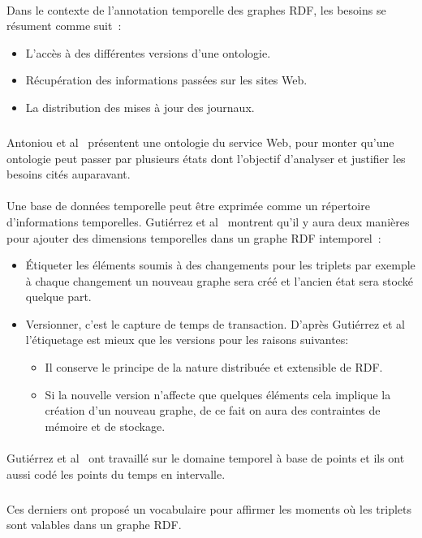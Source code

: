 \documentclass[12pt,a4]{report}
\begin{document}
\paragraph{}
Dans le contexte de l'annotation temporelle des graphes RDF, les besoins se résument comme suit~:
\begin{itemize}
\item L'accès à des différentes versions d’une ontologie.
\item Récupération des informations passées sur les sites Web.
\item La distribution des mises à jour des journaux.
\end{itemize}
\subparagraph{}
Antoniou et al~\cite{antoniou2004} présentent une ontologie du service Web, pour monter qu'une ontologie peut passer par plusieurs états dont l'objectif d'analyser et justifier les besoins cités auparavant.
\paragraph{}
Une base de données temporelle peut être exprimée comme un répertoire d'informations temporelles.
Gutiérrez et al~\cite{gutierrez2007} montrent qu'il y aura deux manières pour ajouter des dimensions temporelles dans un graphe RDF intemporel~:
\begin{itemize}
\item Étiqueter les éléments soumis à des changements pour les triplets par exemple à chaque changement un nouveau graphe sera créé et l’ancien état sera stocké quelque part.
\item Versionner, c'est le capture de temps de transaction. D'après Gutiérrez et al~\cite{gutierrez2007} l’étiquetage est mieux que les versions pour les raisons suivantes:
\begin{itemize}
\item Il conserve le principe de la nature distribuée et extensible de RDF.
\item Si la nouvelle version n’affecte que quelques éléments cela implique la création d’un nouveau graphe, de ce fait on aura des contraintes de mémoire et de stockage. 
\end{itemize}
\end{itemize}
\paragraph{}
Gutiérrez et al~\cite{gutierrez2007} ont travaillé sur le domaine temporel à base de points et ils ont aussi codé les points du temps en intervalle.
\subparagraph{}
Ces derniers ont proposé un vocabulaire pour affirmer les moments où les triplets sont valables dans un graphe RDF.
\end{document}
